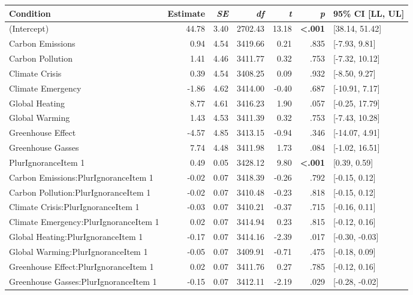 \begin{table}[ht]
\centering
\begin{tabular}{lrrrrrl}
  \hline
Condition & Estimate & \textit{SE} & \textit{df} & \textit{t} & \textit{p} & 95\% CI [LL, UL] \\ 
  \hline
(Intercept) & 44.78 & 3.40 & 2702.43 & 13.18 & \textbf{\textless  .001} & [38.14, 51.42] \\ 
  Carbon Emissions & 0.94 & 4.54 & 3419.66 & 0.21 & .835 & [-7.93, 9.81] \\ 
  Carbon Pollution & 1.41 & 4.46 & 3411.77 & 0.32 & .753 & [-7.32, 10.12] \\ 
  Climate Crisis & 0.39 & 4.54 & 3408.25 & 0.09 & .932 & [-8.50, 9.27] \\ 
  Climate Emergency & -1.86 & 4.62 & 3414.00 & -0.40 & .687 & [-10.91, 7.17] \\ 
  Global Heating & 8.77 & 4.61 & 3416.23 & 1.90 & .057 & [-0.25, 17.79] \\ 
  Global Warming & 1.43 & 4.53 & 3411.39 & 0.32 & .753 & [-7.43, 10.28] \\ 
  Greenhouse Effect & -4.57 & 4.85 & 3413.15 & -0.94 & .346 & [-14.07, 4.91] \\ 
  Greenhouse Gasses & 7.74 & 4.48 & 3411.98 & 1.73 & .084 & [-1.02, 16.51] \\ 
  PlurIgnoranceItem 1 & 0.49 & 0.05 & 3428.12 & 9.80 & \textbf{\textless  .001} & [0.39, 0.59] \\ 
  Carbon Emissions:PlurIgnoranceItem 1 & -0.02 & 0.07 & 3418.39 & -0.26 & .792 & [-0.15, 0.12] \\ 
  Carbon Pollution:PlurIgnoranceItem 1 & -0.02 & 0.07 & 3410.48 & -0.23 & .818 & [-0.15, 0.12] \\ 
  Climate Crisis:PlurIgnoranceItem 1 & -0.03 & 0.07 & 3410.21 & -0.37 & .715 & [-0.16, 0.11] \\ 
  Climate Emergency:PlurIgnoranceItem 1 & 0.02 & 0.07 & 3414.94 & 0.23 & .815 & [-0.12, 0.16] \\ 
  Global Heating:PlurIgnoranceItem 1 & -0.17 & 0.07 & 3414.16 & -2.39 & .017 & [-0.30, -0.03] \\ 
  Global Warming:PlurIgnoranceItem 1 & -0.05 & 0.07 & 3409.91 & -0.71 & .475 & [-0.18, 0.09] \\ 
  Greenhouse Effect:PlurIgnoranceItem 1 & 0.02 & 0.07 & 3411.76 & 0.27 & .785 & [-0.12, 0.16] \\ 
  Greenhouse Gasses:PlurIgnoranceItem 1 & -0.15 & 0.07 & 3412.11 & -2.19 & .029 & [-0.28, -0.02] \\ 
   \hline
\end{tabular}
\end{table}
